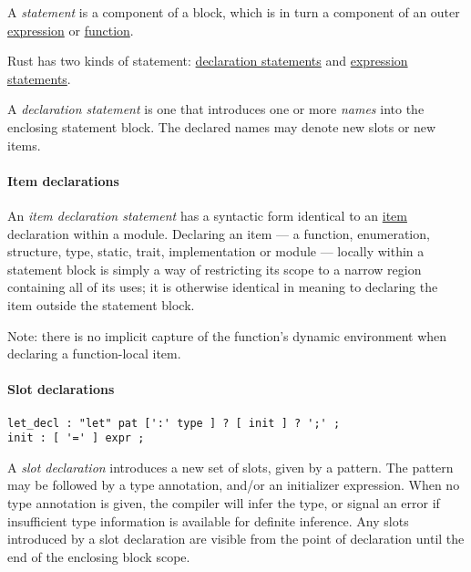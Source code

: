 \documentclass[]{article}
\begin{document}
A \emph{statement} is a component of a block, which is in turn a
component of an outer \hyperref[expressions]{expression} or
\hyperref[functions]{function}.

Rust has two kinds of statement:
\hyperref[declaration-statements]{declaration statements} and
\hyperref[expression-statements]{expression statements}.


A \emph{declaration statement} is one that introduces one or more
\emph{names} into the enclosing statement block. The declared names may
denote new slots or new items.

\paragraph{Item declarations}\label{item-declarations}

An \emph{item declaration statement} has a syntactic form identical to
an \hyperref[items]{item} declaration within a module. Declaring an item
--- a function, enumeration, structure, type, static, trait,
implementation or module --- locally within a statement block is simply
a way of restricting its scope to a narrow region containing all of its
uses; it is otherwise identical in meaning to declaring the item outside
the statement block.

Note: there is no implicit capture of the function's dynamic environment
when declaring a function-local item.

\paragraph{Slot declarations}\label{slot-declarations}

\begin{verbatim}
let_decl : "let" pat [':' type ] ? [ init ] ? ';' ;
init : [ '=' ] expr ;
\end{verbatim}

A \emph{slot declaration} introduces a new set of slots, given by a
pattern. The pattern may be followed by a type annotation, and/or an
initializer expression. When no type annotation is given, the compiler
will infer the type, or signal an error if insufficient type information
is available for definite inference. Any slots introduced by a slot
declaration are visible from the point of declaration until the end of
the enclosing block scope.
\end{document}
